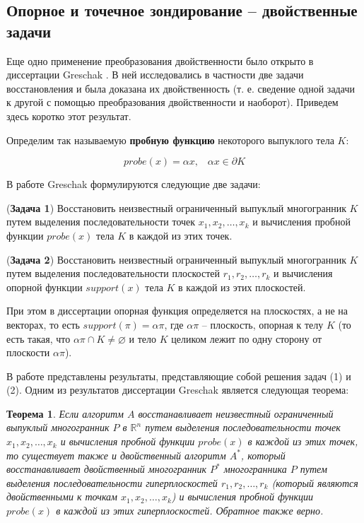 \documentclass[a4paper, 12pt, titlepage]{article}
\theoremstyle{definition}
\theoremstyle{plain}
\newtheorem{SmartTheorem}{Теорема}
\theoremstyle{plain}
\begin{document}
\subsection{Опорное и точечное зондирование -- двойственные задачи}

Еще одно применение преобразования двойственности было открыто в диссертации
Greschak \cite{thesis/Greschak1985}. В ней исследовались в
частности две задачи восстановления и была доказана их
двойственность (т. е. сведение одной задачи к другой с помощью
преобразования двойственности и наоборот). Приведем здесь коротко этот
результат.

Определим так называемую \textbf{пробную функцию} некоторого выпуклого тела $K$:

\begin{equation}
 probe(x) = \alpha x, \;\;\; \alpha x \in \partial K
\end{equation}

В работе Greschak формулируются следующие две задачи:

\begin{flushleft}
 (\textbf{Задача 1}) Восстановить неизвестный ограниченный выпуклый
 многогранник $K$ путем выделения последовательности точек
 $x_{1}, x_{2}, \ldots, x_{k}$ и вычисления пробной функции $probe(x)$ тела $K$
 в каждой из этих точек.
\end{flushleft}

\begin{flushleft}
 (\textbf{Задача 2}) Восстановить неизвестный ограниченный выпуклый
 многогранник $K$ путем выделения последовательности плоскостей
 $r_{1}, r_{2}, \ldots, r_{k}$ и вычисления опорной функции $support(x)$ тела
 $K$ в каждой из этих плоскостей.
\end{flushleft}

При этом в диссертации опорная функция определяется на плоскостях, а не на
векторах, то есть $support(\pi) = \alpha \pi$, где $\alpha \pi$ -- плоскость,
опорная к телу $K$ (то есть такая, что $\alpha \pi \cap K \neq \varnothing$ и
тело $K$ целиком лежит по одну сторону от плоскости $\alpha \pi$).

В работе представлены результаты, представляющие собой решения задач (1) и 
(2). Одним из результатов диссертации Greschak является следующая теорема:

\begin{SmartTheorem}
 Если алгоритм $A$ восстанавливает неизвестный ограниченный выпуклый 
 многогранник $P$ в $\mathbb{R}^{n}$ путем выделения последовательности точек
 $x_{1}, x_{2}, \ldots, x_{k}$ и вычисления пробной функции $probe(x)$ в каждой 
 из этих точек, то существует также и двойственный алгоритм $A^{*}$, который
 восстанавливает двойственный многогранник $P^{*}$ многогранника $P$ путем
 выделения последовательности гиперплоскостей $r_{1}, r_{2}, \ldots, r_{k}$
 (который являются двойственными к точкам $x_{1}, x_{2}, \ldots, x_{k}$)
 и вычисления пробной функции $probe(x)$ в каждой из этих гиперплоскостей.
 Обратное также верно.
\end{SmartTheorem}
\end{document}
